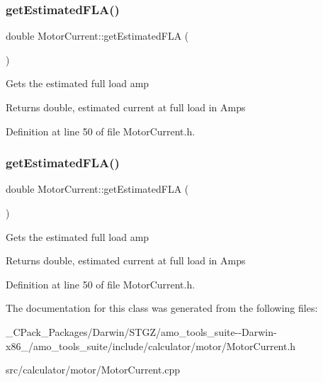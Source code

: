 \subsubsection{\texorpdfstring{get\+Estimated\+F\+L\+A()}{getEstimatedFLA()}\hspace{0.1cm}{\footnotesize\ttfamily [2/3]}}
{\footnotesize\ttfamily double Motor\+Current\+::get\+Estimated\+F\+LA (\begin{DoxyParamCaption}{ }\end{DoxyParamCaption})\hspace{0.3cm}{\ttfamily [inline]}}

Gets the estimated full load amp

\begin{DoxyReturn}{Returns}
double, estimated current at full load in Amps 
\end{DoxyReturn}


Definition at line 50 of file Motor\+Current.\+h.

\mbox{\label{class_motor_current_a0f845ec03585b21a8e476ed3e63f365f}} 
\subsubsection{\texorpdfstring{get\+Estimated\+F\+L\+A()}{getEstimatedFLA()}\hspace{0.1cm}{\footnotesize\ttfamily [3/3]}}
{\footnotesize\ttfamily double Motor\+Current\+::get\+Estimated\+F\+LA (\begin{DoxyParamCaption}{ }\end{DoxyParamCaption})\hspace{0.3cm}{\ttfamily [inline]}}

Gets the estimated full load amp

\begin{DoxyReturn}{Returns}
double, estimated current at full load in Amps 
\end{DoxyReturn}


Definition at line 50 of file Motor\+Current.\+h.



The documentation for this class was generated from the following files\+:\begin{DoxyCompactItemize}
\item 
\+\_\+\+C\+Pack\+\_\+\+Packages/\+Darwin/\+S\+T\+G\+Z/amo\+\_\+tools\+\_\+suite-\/-\/\+Darwin-\/x86\+\_/amo\+\_\+tools\+\_\+suite/include/calculator/motor/Motor\+Current.\+h\item 
src/calculator/motor/Motor\+Current.\+cpp\end{DoxyCompactItemize}
